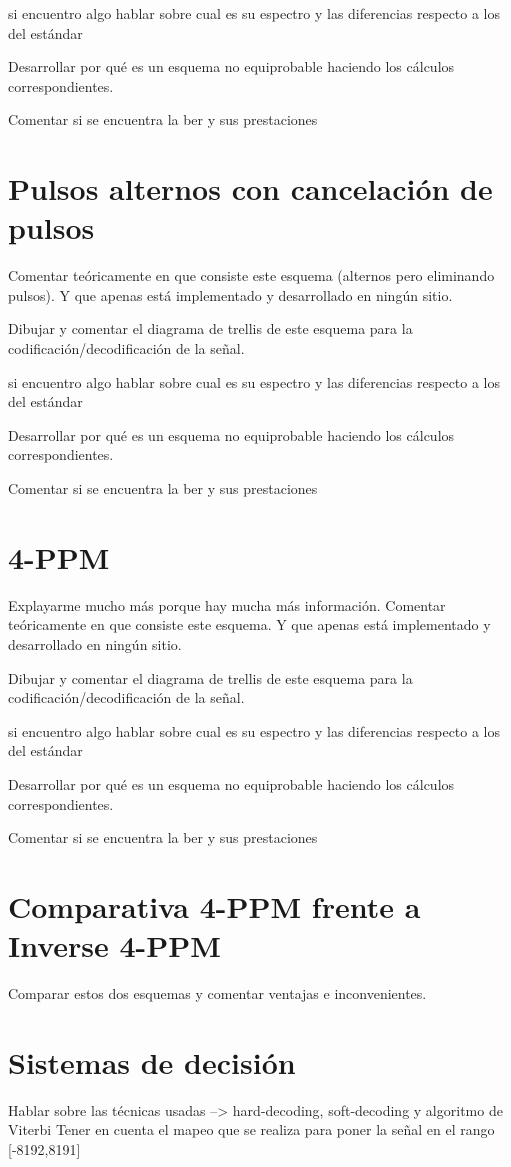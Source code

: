 si encuentro algo hablar sobre cual es su espectro y las diferencias respecto a los del estándar

Desarrollar por qué es un esquema no equiprobable haciendo los cálculos correspondientes.

Comentar si se encuentra la ber y sus prestaciones

\section{Pulsos alternos con cancelación de pulsos}
Comentar teóricamente en que consiste este esquema (alternos pero eliminando pulsos).
Y que apenas está implementado y desarrollado en ningún sitio.

Dibujar y comentar el diagrama de trellis de este esquema para la codificación/decodificación de la señal.

si encuentro algo hablar sobre cual es su espectro y las diferencias respecto a los del estándar

Desarrollar por qué es un esquema no equiprobable haciendo los cálculos correspondientes.

Comentar si se encuentra la ber y sus prestaciones

\section{4-PPM}
Explayarme mucho más porque hay mucha más información.
Comentar teóricamente en que consiste este esquema.
Y que apenas está implementado y desarrollado en ningún sitio.

Dibujar y comentar el diagrama de trellis de este esquema para la codificación/decodificación de la señal.

si encuentro algo hablar sobre cual es su espectro y las diferencias respecto a los del estándar

Desarrollar por qué es un esquema no equiprobable haciendo los cálculos correspondientes.

Comentar si se encuentra la ber y sus prestaciones

\section{Comparativa 4-PPM frente a Inverse 4-PPM}
Comparar estos dos esquemas y comentar ventajas e inconvenientes.

\section{Sistemas de decisión}
Hablar sobre las técnicas usadas --> hard-decoding, soft-decoding y algoritmo de Viterbi
Tener en cuenta el mapeo que se realiza para poner la señal en el rango [-8192,8191]

\chapterend{}

